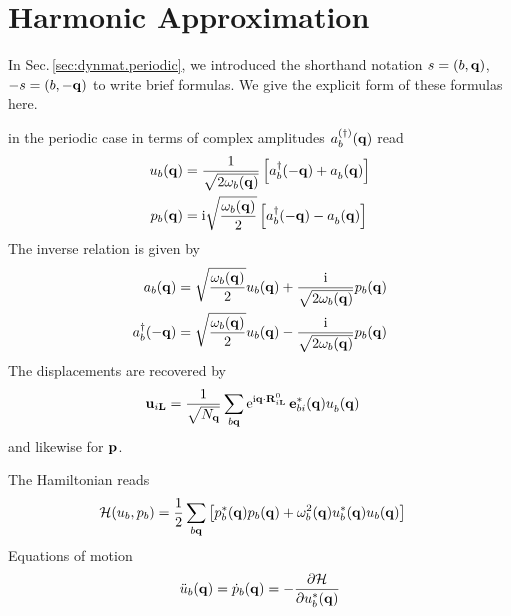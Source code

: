 \section{Harmonic Approximation}
\label{app:ha.formulas}
In Sec.\,\ref{sec:dynmat.periodic}, we introduced the shorthand notation $s=(b, {\bf q})$, $-s=(b, -{\bf q})$ to write brief formulas. We give the explicit form of these formulas here.

 in the periodic case in terms of complex amplitudes $a^{(\dagger)}_b ({\bf q})$ read
\begin{subequations}
	\label{eq:u_b(q).amplitudes}
	\begin{align}
	u_b (\b q)
	&=   \frac{1}{\sqrt{2 \omega_b (\b q)}} \left[ \D a_b (- \b q) + \fD a_b (\b q)  \right] \\
	p_b (\b q)
	&= \im \sqrt{\frac{\omega_b (\b q)}{2}} \left[ \D a_b (- \b q) - \fD a_b (\b q)  \right]
	\end{align}
	\end{subequations}
	The inverse relation is given by
	\begin{subequations}
		\label{eq:a(q)}
		\begin{align}
		a_b ({\bf q})
		&= \sqrt{\frac{\omega_b ({\bf q})}{2}} u_b ({\bf q}) + \frac{{\rm i}}{\sqrt{2 \omega_b ({\bf q})}} p_b ({\bf q}) \\
		a^\dagger_b (-  {\bf q})
		&= \sqrt{\frac{\omega_b ({\bf q})}{2}} u_b ({\bf q}) - \frac{{\rm i}}{\sqrt{2 \omega_b ({\bf q})}} p_b ({\bf q})
		\end{align}
		\end{subequations}
		The displacements are recovered by
		\begin{align}
		\b u_{i \b L}
		&= \frac{1}{\sqrt{N_{\b q}}} \sum_{b \b q} {\rm e}^{\im  \b q \cdot \b R^0_{i \b L}} \, \b e^\ast_{b i} (\b q) \fD u_b (\b q)
		\label{eq:u_iL}
		\end{align}
		and likewise for ${\bf p}$.
		
		The Hamiltonian reads
		\begin{align}
		\mathcal H (u_b, p_b)
		&= \frac{1}{2} \sum_{b {\bf q}} \left[ p^\ast_b ({\bf q}) p_b ({\bf q}) + \omega^2_b ({\bf q}) u^\ast_b ({\bf q}) u_b ({\bf q}) \right] 
		\end{align}
		Equations of motion
		\begin{align}
		\ddot{u}_b ({\bf q})
		= \dot{p}_b ({\bf q})
		= - \frac{\partial \mathcal{H}}{\partial u_b^\ast ({\bf q})}
		\end{align}

